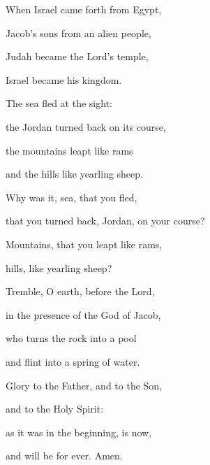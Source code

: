 \noindent When Israel came forth from Egypt,~\GreStar{}~\nopagebreak

Jacob’s sons from an alien people,

\noindent Judah became the Lord’s temple,~\GreStar{}~\nopagebreak

Israel became his kingdom.

\noindent The sea fled at the sight:~\GreStar{}~\nopagebreak

the Jordan turned back on its course,

\noindent the mountains leapt like rams~\GreStar{}~\nopagebreak

and the hills like yearling sheep.

\noindent Why was it, sea, that you fled,~\GreStar{}~\nopagebreak

that you turned back, Jordan, on your course?

\noindent Mountains, that you leapt like rams,~\GreStar{}~\nopagebreak

hills, like yearling sheep?

\noindent Tremble, O earth, before the Lord,~\GreStar{}~\nopagebreak

in the presence of the God of Jacob,

\noindent who turns the rock into a pool~\GreStar{}~\nopagebreak

and flint into a spring of water.

\noindent Glory to the Father, and to the Son,~\GreStar{}~\nopagebreak

and to the Holy Spirit:

\noindent as it was in the beginning, is now,~\GreStar{}~\nopagebreak

and will be for ever. Amen.
